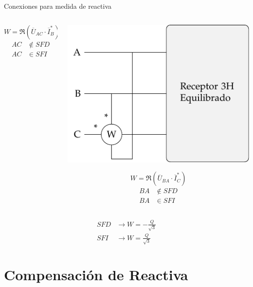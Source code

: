 \documentclass[xcolor={usenames,svgnames,dvipsnames}]{beamer}
\begin{document}
\begin{frame}[label={sec:orgebdcc0c}]{Conexiones para medida de reactiva}
\begin{columns}
\begin{column}{0.33\columnwidth}
\begin{center}
\end{center}
\[
  W = \Re(\overline{U}_{AC} \cdot \overline{I}_B^*)
\]
\begin{align*}
  AC &\notin SFD\\
  AC &\in SFI
\end{align*}
\end{column}
\begin{column}{0.33\columnwidth}
\begin{center}
\includegraphics[width=.9\linewidth]{figs/Reactiva3H_C-BA.pdf}
\end{center}
\[
  W = \Re(\overline{U}_{BA} \cdot \overline{I}_C^*)
\]
\begin{align*}
  BA &\notin SFD\\
  BA &\in SFI
\end{align*}
\end{column}
\end{columns}
\begin{align*}
SFD &\rightarrow \boxed{W = - \frac{Q}{\sqrt{3}}}\\
SFI &\rightarrow \boxed{W = \frac{Q}{\sqrt{3}}}
\end{align*}
\end{frame}


\section{Compensación de Reactiva}
\label{sec:org898c835}
\end{document}
